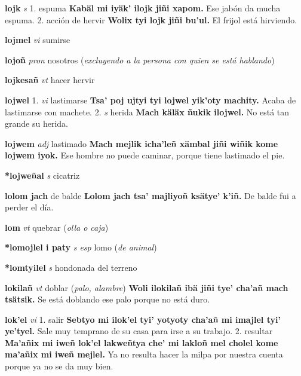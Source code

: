\documentclass[10pt]{scrbook}
\newcommand{\entry}[1]{\textbf{#1}}
\newcommand{\onedefinition}[1]{#1.}
\newcommand{\partofspeech}[1]{\textit{#1}}
\newcommand{\spanishtranslation}[1]{#1}
\newcommand{\clarification}[1]{(\textit{#1})}
\newcommand{\cholexample}[1]{\textbf{#1}}
\newcommand{\exampletranslation}[1]{#1}
\begin{document}
\begin{multicols}{2}
\entry{lojk}
\partofspeech{s}
\onedefinition{1}
\spanishtranslation{espuma}
\cholexample{Kabäl mi iyäk' ilojk jiñi xapom.}
\exampletranslation{Ese jabón da mucha espuma.}
\onedefinition{2}
\spanishtranslation{acción de hervir}
\cholexample{Wolix tyi lojk jiñi bu'ul.}
\exampletranslation{El frijol está hirviendo.}

\entry{lojmel}
\partofspeech{vi}
\spanishtranslation{sumirse}

\entry{lojoñ}
\partofspeech{pron}
\spanishtranslation{nosotros}
\clarification{excluyendo a la persona con quien se está hablando}

\entry{lojkesañ}
\partofspeech{vt}
\spanishtranslation{hacer hervir}

\entry{lojwel}
\onedefinition{1}
\partofspeech{vi}
\spanishtranslation{lastimarse}
\cholexample{Tsa' poj ujtyi tyi lojwel yik'oty machity.}
\exampletranslation{Acaba de lastimarse con machete.}
\onedefinition{2}
\partofspeech{s}
\spanishtranslation{herida}
\cholexample{Mach käläx ñukik ilojwel.}
\exampletranslation{No está tan grande su herida.}

\entry{lojwem}
\partofspeech{adj}
\spanishtranslation{lastimado}
\cholexample{Mach mejlik icha'leñ xämbal jiñi wiñik kome lojwem iyok.}
\exampletranslation{Ese hombre no puede caminar, porque tiene lastimado el pie.}

\entry{*lojweñal}
\partofspeech{s}
\spanishtranslation{cicatriz}

\entry{lolom jach}
\spanishtranslation{de balde}
\cholexample{Lolom jach tsa' majliyoñ ksätye' k'iñ.}
\exampletranslation{De balde fui a perder el día.}

\entry{lom}
\partofspeech{vt}
\spanishtranslation{quebrar}
\clarification{olla o caja}

\entry{*lomojlel i paty}
\partofspeech{s esp}
\spanishtranslation{lomo}
\clarification{de animal}

\entry{*lomtyilel}
\partofspeech{s}
\spanishtranslation{hondonada del terreno}

\entry{lokilañ}
\partofspeech{vt}
\spanishtranslation{doblar}
\clarification{palo, alambre}
\cholexample{Woli ilokilañ ibä jiñi tye' cha'añ mach tsätsik.}
\exampletranslation{Se está doblando ese palo porque no está duro.}

\entry{lok'el}
\partofspeech{vi}
\onedefinition{1}
\spanishtranslation{salir}
\cholexample{Sebtyo mi ilok'el tyi' yotyoty cha'añ mi imajlel tyi' ye'tyel.}
\exampletranslation{Sale muy temprano de su casa para irse a su trabajo.}
\onedefinition{2}
\spanishtranslation{resultar}
\cholexample{Ma'añix mi iweñ lok'el lakweñtya che' mi lakloñ mel cholel kome ma'añix mi iweñ mejlel.}
\exampletranslation{Ya no resulta hacer la milpa por nuestra cuenta porque ya no se da muy bien.}


\end{multicols}
\end{document}
